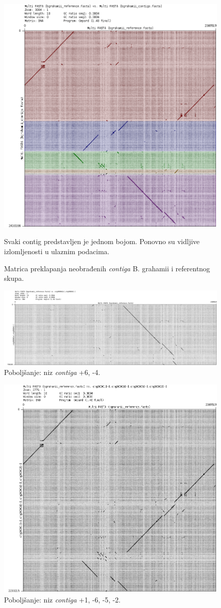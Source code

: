 \documentclass[times, utf8, seminar, numeric]{fer}
\begin{document}
\begin{figure}[h]
	\centering
	\centerline{\includegraphics[width=0.7\linewidth]{img/bh_contigs}}
	\caption{Matrica preklapanja neobrađenih \textit{contiga} B. grahamii i referentnog skupa.}
	\label{fig:bhcontigs}
	\small
	Svaki contig predstavljen je jednom bojom. Ponovno su vidljive izlomljenosti u ulaznim podacima.
\end{figure}

\begin{figure}[h]
	\centering
	\centerline{\includegraphics[width=0.7\linewidth]{img/bh_6_4}}
	\caption{Poboljšanje: niz \textit{contiga} +6, -4.}
	\label{fig:bh64}
\end{figure}

\begin{figure}[h]
	\centering
	\centerline{\includegraphics[width=0.7\linewidth]{img/bh_1_6_2}}
	\caption{Poboljšanje: niz \textit{contiga} +1, -6, -5, -2.}
	\label{fig:bh162}
\end{figure}
\end{document}

